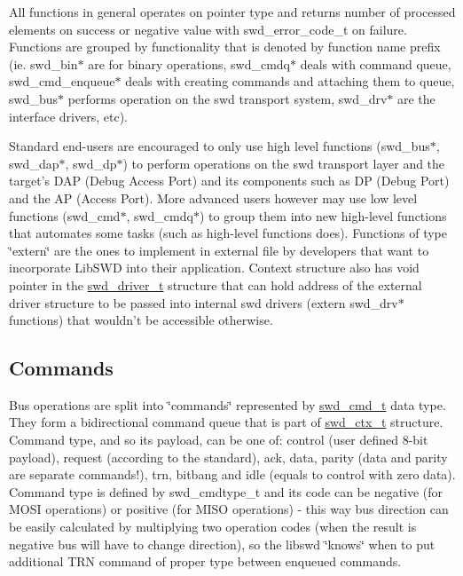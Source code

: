 All functions in general operates on pointer type and returns number of processed elements on success or negative value with swd\_\-error\_\-code\_\-t on failure. Functions are grouped by functionality that is denoted by function name prefix (ie. swd\_\-bin$\ast$ are for binary operations, swd\_\-cmdq$\ast$ deals with command queue, swd\_\-cmd\_\-enqueue$\ast$ deals with creating commands and attaching them to queue, swd\_\-bus$\ast$ performs operation on the swd transport system, swd\_\-drv$\ast$ are the interface drivers, etc).

Standard end-\/users are encouraged to only use high level functions (swd\_\-bus$\ast$, swd\_\-dap$\ast$, swd\_\-dp$\ast$) to perform operations on the swd transport layer and the target's DAP (Debug Access Port) and its components such as DP (Debug Port) and the AP (Access Port). More advanced users however may use low level functions (swd\_\-cmd$\ast$, swd\_\-cmdq$\ast$) to group them into new high-\/level functions that automates some tasks (such as high-\/level functions does). Functions of type \char`\"{}extern\char`\"{} are the ones to implement in external file by developers that want to incorporate LibSWD into their application. Context structure also has void pointer in the \hyperlink{structswd__driver__t}{swd\_\-driver\_\-t} structure that can hold address of the external driver structure to be passed into internal swd drivers (extern swd\_\-drv$\ast$ functions) that wouldn't be accessible otherwise.\hypertarget{index_doc_commands}{}\subsection{Commands}\label{index_doc_commands}
Bus operations are split into \char`\"{}commands\char`\"{} represented by \hyperlink{structswd__cmd__t}{swd\_\-cmd\_\-t} data type. They form a bidirectional command queue that is part of \hyperlink{structswd__ctx__t}{swd\_\-ctx\_\-t} structure. Command type, and so its payload, can be one of: control (user defined 8-\/bit payload), request (according to the standard), ack, data, parity (data and parity are separate commands!), trn, bitbang and idle (equals to control with zero data). Command type is defined by swd\_\-cmdtype\_\-t and its code can be negative (for MOSI operations) or positive (for MISO operations) -\/ this way bus direction can be easily calculated by multiplying two operation codes (when the result is negative bus will have to change direction), so the libswd \char`\"{}knows\char`\"{} when to put additional TRN command of proper type between enqueued commands.


